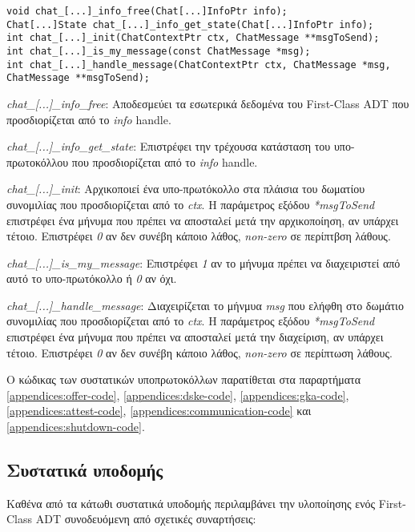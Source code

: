 \begin{lstlisting}[caption={Γενική διεπαφή υπο-πρωτοκόλλων},label={lst:subprotocol-interface-greek}]
void chat_[...]_info_free(Chat[...]InfoPtr info);
Chat[...]State chat_[...]_info_get_state(Chat[...]InfoPtr info);
int chat_[...]_init(ChatContextPtr ctx, ChatMessage **msgToSend);
int chat_[...]_is_my_message(const ChatMessage *msg);
int chat_[...]_handle_message(ChatContextPtr ctx, ChatMessage *msg, ChatMessage **msgToSend);
\end{lstlisting}

\begin{description}
  \item \emph{chat\_[...]\_info\_free}: Αποδεσμεύει τα εσωτερικά δεδομένα του First-Class ADT που προσδιορίζεται από το \emph{info} handle.

  \item \emph{chat\_[...]\_info\_get\_state}: Επιστρέφει την τρέχουσα κατάσταση του υπο-πρωτοκόλλου που προσδιορίζεται από το \emph{info} handle.

  \item \emph{chat\_[...]\_init}: Αρχικοποιεί ένα υπο-πρωτόκολλο στα πλάισια του δωματίου συνομιλίας που προσδιορίζεται από το \emph{ctx}. Η παράμετρος εξόδου \emph{*msgToSend} επιστρέφει ένα μήνυμα που πρέπει να αποσταλεί μετά την αρχικοποίηση, αν υπάρχει τέτοιο. Επιστρέφει \emph{0} αν δεν συνέβη κάποιο λάθος, \emph{non-zero} σε περίπτβση λάθους. 

  \item \emph{chat\_[...]\_is\_my\_message}: Επιστρέφει \emph{1} αν το μήνυμα πρέπει να διαχειριστεί από αυτό το υπο-πρωτόκολλο ή \emph{0} αν όχι.

  \item \emph{chat\_[...]\_handle\_message}: Διαχειρίζεται το μήνμυα \emph{msg} που ελήφθη στο δωμάτιο συνομιλίας που προσδιορίζεται από το \emph{ctx}. Η παράμετρος εξόδου \emph{*msgToSend} επιστρέφει ένα μήνυμα που πρέπει να αποσταλεί μετά την διαχείριση, αν υπάρχει τέτοιο. Επιστρέφει \emph{0} αν δεν συνέβη κάποιο λάθος, \emph{non-zero} σε περίπτωση λάθους. 
\end{description}

Ο κώδικας των συστατικών υποπρωτοκόλλων παρατίθεται στα παραρτήματα \ref{appendices:offer-code}, \ref{appendices:dske-code}, \ref{appendices:gka-code}, \ref{appendices:attest-code}, \ref{appendices:communication-code} και \ref{appendices:shutdown-code}.

\subsection{Συστατικά υποδομής}
\label{section:infrastructure-components-greek}
Καθένα από τα κάτωθι συστατικά υποδομής περιλαμβάνει την υλοποίησης ενός First-Class ADT συνοδευόμενη από σχετικές συναρτήσεις:

